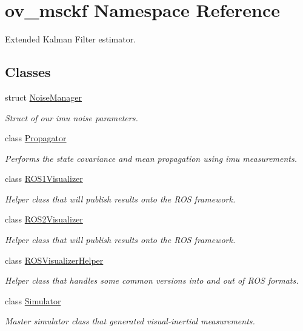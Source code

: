 \hypertarget{namespaceov__msckf}{}\section{ov\+\_\+msckf Namespace Reference}
\label{namespaceov__msckf}


Extended Kalman Filter estimator.  


\subsection*{Classes}
\begin{DoxyCompactItemize}
\item 
struct \hyperlink{structov__msckf_1_1NoiseManager}{Noise\+Manager}
\begin{DoxyCompactList}\small\item\em Struct of our imu noise parameters. \end{DoxyCompactList}\item 
class \hyperlink{classov__msckf_1_1Propagator}{Propagator}
\begin{DoxyCompactList}\small\item\em Performs the state covariance and mean propagation using imu measurements. \end{DoxyCompactList}\item 
class \hyperlink{classov__msckf_1_1ROS1Visualizer}{R\+O\+S1\+Visualizer}
\begin{DoxyCompactList}\small\item\em Helper class that will publish results onto the R\+OS framework. \end{DoxyCompactList}\item 
class \hyperlink{classov__msckf_1_1ROS2Visualizer}{R\+O\+S2\+Visualizer}
\begin{DoxyCompactList}\small\item\em Helper class that will publish results onto the R\+OS framework. \end{DoxyCompactList}\item 
class \hyperlink{classov__msckf_1_1ROSVisualizerHelper}{R\+O\+S\+Visualizer\+Helper}
\begin{DoxyCompactList}\small\item\em Helper class that handles some common versions into and out of R\+OS formats. \end{DoxyCompactList}\item 
class \hyperlink{classov__msckf_1_1Simulator}{Simulator}
\begin{DoxyCompactList}\small\item\em Master simulator class that generated visual-\/inertial measurements. \end{DoxyCompactList}\item 

\end{DoxyCompactItemize}
